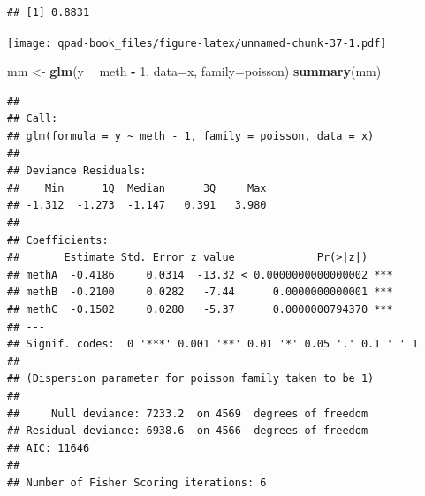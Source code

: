 \documentclass[12pt,]{book}
\newenvironment{Shaded}{\begin{snugshade}}{\end{snugshade}}
\newcommand{\DataTypeTok}[1]{\textcolor[rgb]{0.13,0.29,0.53}{#1}}
\newcommand{\DecValTok}[1]{\textcolor[rgb]{0.00,0.00,0.81}{#1}}
\newcommand{\KeywordTok}[1]{\textcolor[rgb]{0.13,0.29,0.53}{\textbf{#1}}}
\newcommand{\NormalTok}[1]{#1}
\newcommand{\OperatorTok}[1]{\textcolor[rgb]{0.81,0.36,0.00}{\textbf{#1}}}
\newcommand{\OtherTok}[1]{\textcolor[rgb]{0.56,0.35,0.01}{#1}}
\newcommand{\StringTok}[1]{\textcolor[rgb]{0.31,0.60,0.02}{#1}}
\begin{document}
\begin{verbatim}
## [1] 0.8831
\end{verbatim}

\begin{Shaded}
\end{Shaded}

\texttt{[image: qpad-book\_files/figure-latex/unnamed-chunk-37-1.pdf]}

\begin{Shaded}
\begin{Highlighting}[]
\NormalTok{mm <-}\StringTok{ }\KeywordTok{glm}\NormalTok{(y }\OperatorTok{~}\StringTok{ }\NormalTok{meth }\OperatorTok{-}\StringTok{ }\DecValTok{1}\NormalTok{, }\DataTypeTok{data=}\NormalTok{x, }\DataTypeTok{family=}\NormalTok{poisson)}
\KeywordTok{summary}\NormalTok{(mm)}
\end{Highlighting}
\end{Shaded}

\begin{verbatim}
## 
## Call:
## glm(formula = y ~ meth - 1, family = poisson, data = x)
## 
## Deviance Residuals: 
##    Min      1Q  Median      3Q     Max  
## -1.312  -1.273  -1.147   0.391   3.980  
## 
## Coefficients:
##       Estimate Std. Error z value             Pr(>|z|)    
## methA  -0.4186     0.0314  -13.32 < 0.0000000000000002 ***
## methB  -0.2100     0.0282   -7.44      0.0000000000001 ***
## methC  -0.1502     0.0280   -5.37      0.0000000794370 ***
## ---
## Signif. codes:  0 '***' 0.001 '**' 0.01 '*' 0.05 '.' 0.1 ' ' 1
## 
## (Dispersion parameter for poisson family taken to be 1)
## 
##     Null deviance: 7233.2  on 4569  degrees of freedom
## Residual deviance: 6938.6  on 4566  degrees of freedom
## AIC: 11646
## 
## Number of Fisher Scoring iterations: 6
\end{verbatim}
\end{document}
